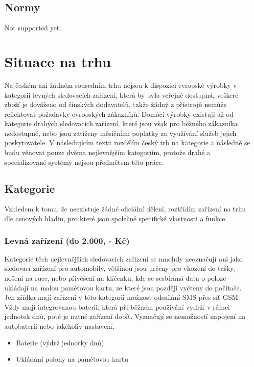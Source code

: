 \documentclass[FM,BP]{tulthesis}
\begin{document}
\section{Normy}
Not supported yet.

\chapter{Situace na trhu}
Na českém ani žádném sousedním trhu nejsou k dispozici evropské výrobky v kategorii levných sledovacích zařízení, která by byla veřejně dostupná, veškeré zboží je dováženo od čínských dodavatelů, takže žádný z přístrojů nemůže reflektovat požadavky evropských zákazníků. Domácí výrobky existují až od kategorie drahých sledovacích zařízení, které jsou však pro běžného zákazníka nedostupné, nebo jsou zatíženy měsíčními poplatky za využívání služeb jejich poskytovatele. V následujícím textu rozdělím český trh na kategorie a následně se budu věnovat pouze dvěma nejlevnějším kategoriím, protože drahé a specializované systémy nejsou předmětem této práce.

\section{Kategorie}
Vzhledem k tomu, že neexistuje žádné oficiální dělení, roztřídím zařízení na trhu dle cenových hladin, pro které jsou společné specifické vlastnosti a funkce.

\subsection{Levná zařízení (do 2.000, - Kč)}
Kategorie těch nejlevnějších sledovacích zařízení se mnohdy neoznačují ani jako sledovací zařízení pro automobily, většinou jsou určeny pro vhození do tašky, nošení na ruce, nebo přivěšení na klíčenku, kde se sesbíraná data o poloze ukládají na malou paměťovou kartu, ze které jsou později vyčteny do počítače. Jen zřídka mají zařízení v této kategorii možnost odesílání SMS přes síť GSM. Vždy mají integrovanou baterii, která při běžném používání vydrží v rámci jednotek dnů, poté je nutné zařízení dobít. Vyznačují se nemožností napojení na autobaterii nebo jakékoliv nastavení.

\begin{itemize}
\item Baterie (výdrž jednotky dnů)
\item Ukládání polohy na paměťovou kartu
\end{itemize}
\end{document}
